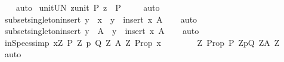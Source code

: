\begin{isabellebody}
%
\isadelimproof
\ \ %
\endisadelimproof
%
\isatagproof
{}\isamarkupfalse%
\ auto%
\endisatagproof
{\isafoldproof}%
%
\isadelimproof
\isanewline
%
\endisadelimproof
\isanewline
{}\isamarkupfalse%
\ unit{\isacharunderscore}UN{\isacharcolon}\ {\isachardoublequoteopen}{\isacharparenleft}{\isasymUnion}z{\isacharcolon}{\isacharcolon}unit{\isachardot}\ P\ z{\isacharparenright}\ {\isacharequal}\ P\ {\isacharparenleft}{\isacharparenright}{\isachardoublequoteclose}\isanewline
%
\isadelimproof
\ \ %
\endisadelimproof
%
\isatagproof
{}\isamarkupfalse%
\ auto%
\endisatagproof
{\isafoldproof}%
%
\isadelimproof
\isanewline
%
\endisadelimproof
\isanewline
{}\isamarkupfalse%
\ subset{\isacharunderscore}singleton{\isacharunderscore}insert{}{\isacharcolon}\ {\isachardoublequoteopen}y\ {\isacharequal}\ x\ {\isasymLongrightarrow}\ {\isacharbraceleft}y{\isacharbraceright}\ {\isasymsubseteq}\ insert\ x\ A{\isachardoublequoteclose}\isanewline
%
\isadelimproof
\ \ %
\endisadelimproof
%
\isatagproof
{}\isamarkupfalse%
\ auto%
\endisatagproof
{\isafoldproof}%
%
\isadelimproof
\isanewline
%
\endisadelimproof
\isanewline
{}\isamarkupfalse%
\ subset{\isacharunderscore}singleton{\isacharunderscore}insert{}{\isacharcolon}\ {\isachardoublequoteopen}{\isacharbraceleft}y{\isacharbraceright}\ {\isasymsubseteq}\ A\ {\isasymLongrightarrow}\ {\isacharbraceleft}y{\isacharbraceright}\ {\isasymsubseteq}\ insert\ x\ A{\isachardoublequoteclose}\isanewline
%
\isadelimproof
\ \ %
\endisadelimproof
%
\isatagproof
{}\isamarkupfalse%
\ auto%
\endisatagproof
{\isafoldproof}%
%
\isadelimproof
\isanewline
%
\endisadelimproof
\isanewline
{}\isamarkupfalse%
\ in{\isacharunderscore}Specs{\isacharunderscore}simp{\isacharcolon}\ {\isachardoublequoteopen}{\isacharparenleft}{\isasymforall}x{\isasymin}{\isasymUnion}Z{\isachardot}\ {\isacharbraceleft}{\isacharparenleft}P\ Z{\isacharcomma}\ p{\isacharcomma}\ Q\ Z{\isacharcomma}\ A\ Z{\isacharparenright}{\isacharbraceright}{\isachardot}\ Prop\ x{\isacharparenright}\ {\isacharequal}\isanewline
\ \ \ \ \ \ \ {\isacharparenleft}{\isasymforall}Z{\isachardot}\ Prop\ {\isacharparenleft}P\ Z{\isacharcomma}p{\isacharcomma}Q\ Z{\isacharcomma}A\ Z{\isacharparenright}{\isacharparenright}{\isachardoublequoteclose}\isanewline
%
\isadelimproof
\ \ %
\endisadelimproof
%
\isatagproof
{}\isamarkupfalse%
\ auto%
\endisatagproof
{\isafoldproof}%
%
\isadelimproof
\isanewline
%
\endisadelimproof
\isanewline
{}\isamarkupfalse%

\end{isabellebody}
